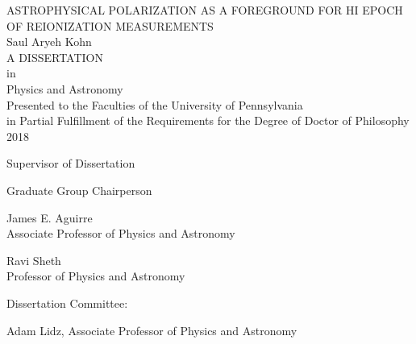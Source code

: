 \documentclass[12pt,twoside,openany]{book}
\newcommand{\doublespaced}{\renewcommand{\baselinestretch}{2}\normalfont}
\newcommand{\singlespaced}{\renewcommand{\baselinestretch}{1}\normalfont}
\newcommand{\halfspaced}{\renewcommand{\baselinestretch}{1.5}\normalfont}
\newcommand{\tita}{ASTROPHYSICAL POLARIZATION AS A FOREGROUND FOR HI EPOCH OF REIONIZATION MEASUREMENTS}
\begin{document}
\frontmatter
\doublespaced
\thispagestyle{empty}
\parskip=0.3in
\begin{center}
{\tita }\\

Saul Aryeh Kohn\\

A DISSERTATION\\

in\\ 

Physics and Astronomy\\

Presented to the Faculties of the University of Pennsylvania \\
in Partial Fulfillment of the Requirements for the Degree of Doctor of Philosophy\\

2018
\end{center}
\parskip=0in

\begin{multicols}{2}
\noindent Supervisor of Dissertation \\

\begin{flushright}
\noindent Graduate Group Chairperson\\
\end{flushright}

\end{multicols}

\noindent\makebox[0in][l]{\rule[2ex]{2.8in}{.3mm}} \hspace{3.05in} \makebox[0in][l]{\rule[2ex]{2.8in}{.3mm}} 
\vspace{-.5in}
\begin{multicols}{2}
\singlespaced
\noindent James E. Aguirre\\ \small Associate Professor of Physics and Astronomy\\

\normalsize

\begin{flushright}
Ravi Sheth\\ \small Professor of Physics and Astronomy
\end{flushright}
\end{multicols}

\halfspaced
\noindent Dissertation Committee:

\noindent Adam Lidz, Associate Professor of Physics and Astronomy
\end{document}
